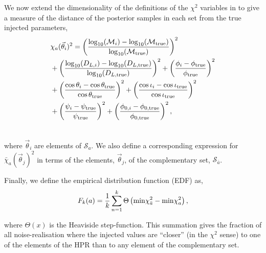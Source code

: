 \documentclass[twocolappendix,tighten]{emulateapj}
\begin{document}
We now extend the dimensionality of the definitions of the $\chi^2$ variables in \citet{ellis-first-order} to give a measure of the distance of the posterior samples in each set from the true injected parameters,
\begin{align}
&\chi_a(\vec\theta_i)^2 = \left(\frac{\log_{10}(\mathcal{M}_i)-\log_{10}(\mathcal{M}_{\rm true})}{\log_{10}(\mathcal{M}_{\rm true})}\right)^2 \nonumber\\
&+ \left(\frac{\log_{10}(D_{L,i})-\log_{10}(D_{L,\rm true})}{\log_{10}(D_{L,\rm true})}\right)^2 + \left(\frac{\phi_i-\phi_{\rm true}}{\phi_{\rm true}}\right)^2 \nonumber\\ 
&+ \left(\frac{\cos\theta_i-\cos\theta_{\rm true}}{\cos\theta_{\rm true}}\right)^2 + \left(\frac{\cos\iota_i-\cos\iota_{\rm true}}{\cos\iota_{\rm true}}\right)^2 \nonumber\\
&+ \left(\frac{\psi_i-\psi_{\rm true}}{\psi_{\rm true}}\right)^2 + \left(\frac{\phi_{0,i}-\phi_{0,\rm true}}{\phi_{0,\rm true}}\right)^2, \\\nonumber
\end{align}

where $\vec\theta_i$ are elements of $\mathcal{S}_a$. We also define a corresponding expression for $\bar\chi_a(\vec\theta_j)^2$ in terms of the elements, $\vec\theta_j$, of the complementary set, $\mathcal{S}_{\bar a}$.

Finally, we define the empirical distribution function (EDF) as,
\begin{equation}
F_k(a) = \frac{1}{k}\sum_{n=1}^k\Theta\left({\rm min} \chi_{\bar a}^2 - {\rm min} \chi_a^2\right),
\end{equation}

where $\Theta(x)$ is the Heaviside step-function. This summation gives the fraction of all noise-realisation where the injected values are ``closer'' (in the $\chi^2$ sense) to one of the elements of the HPR than to any element of the complementary set. 
\end{document}
